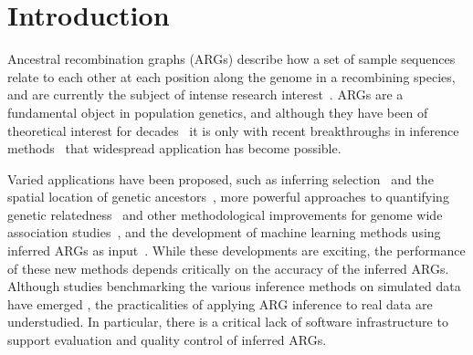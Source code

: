 \documentclass[unnumsec,webpdf,contemporary,large,namedate]{oup-authoring-template}%
\begin{document}
 \maketitle 

\section{Introduction}
Ancestral recombination graphs (ARGs) describe how a set of sample
sequences relate to each other at each position along the genome in a
recombining
species, and are currently the subject of intense research
interest~\citep{brandt2024promise,lewanski2024era,nielsen2024inference,
wong2024general}. ARGs are a fundamental object in population genetics,
and although they have been of theoretical interest for
decades~\citep{Hudson1983,Griffiths1996,Griffiths1997} it is only with recent breakthroughs
in inference methods~\citep{rasmussen2014genome,speidel2019method,kelleher2019inferring,
wohns2022unified,zhang2023biobank,gunnarsson2024scalable,deng2024robust} that 
widespread application has become possible. 

Varied applications have been proposed,
such as inferring selection~\citep{stern2019approximate,hejase2022deep} and
the spatial location of genetic ancestors~\citep{osmond2024estimating,deraje2024inferring,grundler2025geographic},
more powerful approaches to quantifying genetic
relatedness~\citep{fan2022genealogical,zhang2023biobank,gunnarsson2024scalable,lehmann2025on}
and other methodological improvements for genome wide association
studies~\citep{nowbandegani2023extremely,link2023tree},
and the development of machine learning methods using inferred
ARGs as input~\citep{hejase2022deep,pearson2023local,korfmann2024simultaneous,
whitehouse2024tree}.
While these developments are exciting, the performance 
of these new methods depends critically on the accuracy of the inferred ARGs.
Although studies benchmarking the various inference methods on 
simulated data have emerged 
\citep{brandt2022evaluation,deng2024robust,peng2024evaluating},
the practicalities of applying ARG inference to real data are 
understudied. In particular, there is a critical lack of software 
infrastructure to support evaluation and quality control of 
inferred ARGs.
\end{document}
